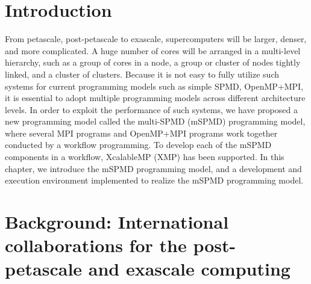 \documentclass[graybox]{svmult}
\begin{document}

\section{Introduction}

From petascale, post-petascale to exascale, supercomputers will be larger, denser, and more complicated. A huge number of cores will be arranged in a multi-level hierarchy, such as a group of cores in a node, a group or cluster of nodes tightly linked, and a cluster of clusters. 
Because it is not easy to fully utilize such systems for current programming models such as simple SPMD, OpenMP+MPI, it is essential to adopt multiple programming models across different architecture levels. 
In order to exploit the performance of such systems, we have proposed a new programming model called the multi-SPMD (mSPMD) programming model, where several MPI programs and OpenMP+MPI programs work together conducted by a workflow programming\cite{tsuji2013c}. To develop each of the mSPMD components in a workflow, XcalableMP (XMP) has been supported. In this chapter, we introduce the mSPMD programming model, and a development and execution environment implemented to realize the mSPMD programming model.

\section{Background: International collaborations for the post-petascale and exascale computing}
\end{document}
